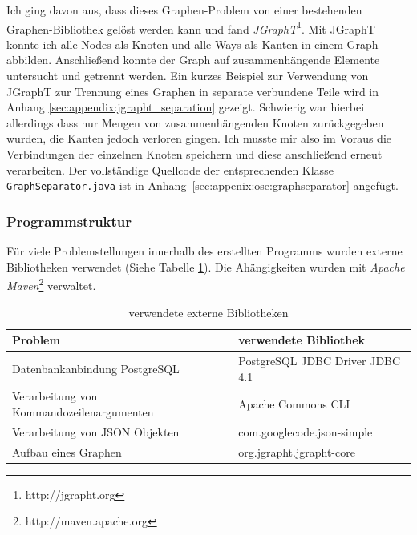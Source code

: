 Ich ging davon aus, dass dieses Graphen-Problem von einer bestehenden Graphen-Bibliothek gelöst werden kann und fand \textit{JGraphT}\footnote{http://jgrapht.org}.
Mit JGraphT konnte ich alle Nodes als Knoten und alle Ways als Kanten in einem Graph abbilden.
Anschließend konnte der Graph auf zusammenhängende Elemente untersucht und getrennt werden.
Ein kurzes Beispiel zur Verwendung von JGraphT zur Trennung eines Graphen in separate verbundene Teile wird in Anhang \ref{sec:appendix:jgrapht_separation} gezeigt.
Schwierig war hierbei allerdings dass nur Mengen von zusammenhängenden Knoten zurückgegeben wurden, die Kanten jedoch verloren gingen.
Ich musste mir also im Voraus die Verbindungen der einzelnen Knoten speichern und diese anschließend erneut verarbeiten.
Der vollständige Quellcode der entsprechenden Klasse \texttt{GraphSeparator.java} ist in Anhang~\ref{sec:appenix:ose:graphseparator} angefügt.

\subsubsection{Programmstruktur}
Für viele Problemstellungen innerhalb des erstellten Programms wurden externe Bibliotheken verwendet (Siehe Tabelle \ref{tab:OsmosisStreetExtractor:Libraries}).
Die Ahängigkeiten wurden mit \textit{Apache Maven}\footnote{http://maven.apache.org} verwaltet.
\begin{table}[htb]
\centering
\caption{verwendete externe Bibliotheken}
\label{tab:OsmosisStreetExtractor:Libraries}
\begin{tabular}{|l|l|}
\hline
\textbf{Problem}                          & \textbf{verwendete Bibliothek}     \\ \hline
Datenbankanbindung PostgreSQL             & PostgreSQL JDBC Driver JDBC 4.1    \\ \hline
Verarbeitung von Kommandozeilenargumenten & Apache Commons CLI                 \\ \hline
Verarbeitung von JSON Objekten            & com.googlecode.json-simple         \\ \hline
Aufbau eines Graphen                      & org.jgrapht.jgrapht-core           \\ \hline
\end{tabular}
\end{table}

